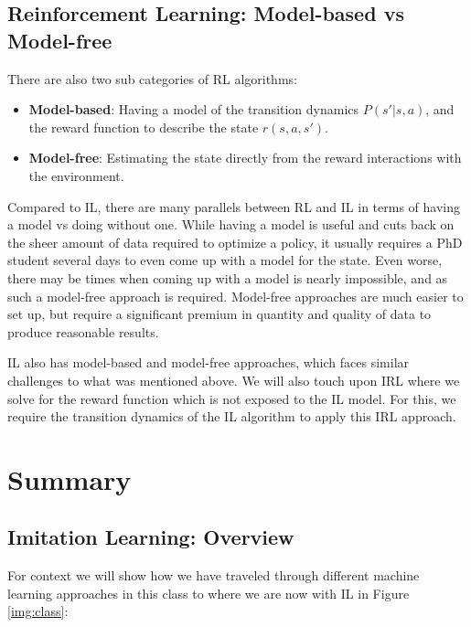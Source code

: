 \documentclass[11pt]{article}
\begin{document}
\subsection{Reinforcement Learning: Model-based vs Model-free} 

There are also two sub categories of RL algorithms:

\begin{itemize}
    \item \textbf{Model-based}: Having a model of the transition dynamics $P(s'|s,a)$, and the reward function to describe the state $r(s,a,s')$.
    \item \textbf{Model-free}: Estimating the state directly from the reward interactions with the environment.
\end{itemize}

Compared to IL, there are many parallels between RL and IL in terms of having a model vs doing without one. While having a model is useful and cuts back on the sheer amount of data required to optimize a policy, it usually requires a PhD student several days to even come up with a model for the state. Even worse, there may be times when coming up with a model is nearly impossible, and as such a model-free approach is required. Model-free approaches are much easier to set up, but require a significant premium in quantity and quality of data to produce reasonable results. 

IL also has model-based and model-free approaches, which faces similar challenges to what was mentioned above. We will also touch upon IRL where we solve for the reward function which is not exposed to the IL model. For this, we require the transition dynamics of the IL algorithm to apply this IRL approach. 

\pagebreak

\section{Summary}

\subsection{Imitation Learning: Overview}

For context we will show how we have traveled through different machine learning approaches in this class to where we are now with IL in Figure \ref{img:class}:
\end{document}
